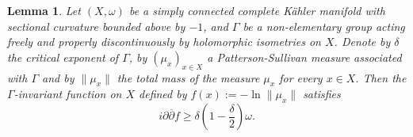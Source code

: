 \documentclass{article}
\newtheorem{lemma}[theorem]{Lemma}
\theoremstyle{definition}
\theoremstyle{remark}
\begin{document}
	\begin{lemma}\label{lem-f-unif-spsh}
		Let $(X,\omega)$ be a simply connected complete Kähler manifold with sectional curvature bounded above by $-1$, and $\Gamma$ be a non-elementary group acting freely and properly discontinuously by holomorphic isometries on $X$. Denote by $\delta$ the critical exponent of $\Gamma$, by $(\mu_x)_{x\in X}$ a Patterson-Sullivan measure associated with $\Gamma$ and by $\lVert \mu_x\rVert$ the total mass of the measure $\mu_x$ for every $x\in X$. Then the $\Gamma$-invariant function on $X$ defined by $f(x):=-\ln \lVert \mu_x\rVert$ satisfies \begin{equation*}
			i\partial\overline{\partial}{f} \ge \delta(1-\frac{\delta}{2})\omega.
		\end{equation*}
	\end{lemma}
	
\end{document}
